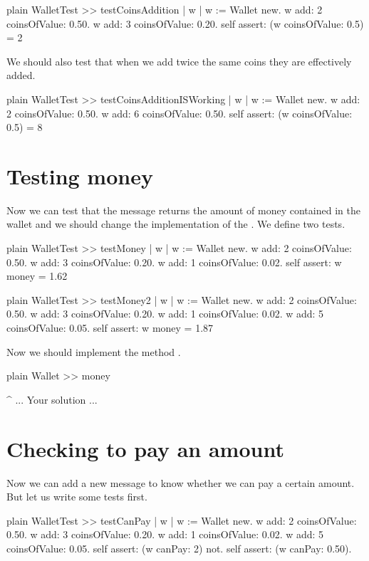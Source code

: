 \documentclass[10pt,twoside,english]{_support/latex/sbabook/sbabook}
\begin{document}
\begin{displaycode}{plain}
WalletTest >> testCoinsAddition
	| w |
	w := Wallet new.
	w add: 2 coinsOfValue: 0.50.
	w add: 3 coinsOfValue: 0.20.
	self assert: (w coinsOfValue: 0.5) = 2
\end{displaycode}

We should also test that when we add twice the same coins they are effectively added. 

\begin{displaycode}{plain}
WalletTest >> testCoinsAdditionISWorking
	| w |
	w := Wallet new.
	w add: 2 coinsOfValue: 0.50.
	w add: 6 coinsOfValue: 0.50.
	self assert: (w coinsOfValue: 0.5) = 8
\end{displaycode}
\section{Testing money}
Now we can test that the  message returns the amount of money contained in the wallet and we should change
the implementation of the . We define two tests. 

\begin{displaycode}{plain}
WalletTest >> testMoney
	| w |
	w := Wallet new.
	w add: 2 coinsOfValue: 0.50.
	w add: 3 coinsOfValue: 0.20.
	w add: 1 coinsOfValue: 0.02.
	self assert: w money = 1.62
\end{displaycode}

\begin{displaycode}{plain}
WalletTest >> testMoney2
	| w |
	w := Wallet new.
	w add: 2 coinsOfValue: 0.50.
	w add: 3 coinsOfValue: 0.20.
	w add: 1 coinsOfValue: 0.02.
	w add: 5 coinsOfValue: 0.05.
	self assert: w money = 1.87
\end{displaycode}

Now we should implement the method . 

\begin{displaycode}{plain}
Wallet >> money

	^ ... Your solution ...
\end{displaycode}
\section{Checking to pay an amount}
Now we can add a new message to know whether we can pay a certain amount. But let us write some tests first. 

\begin{displaycode}{plain}
WalletTest >> testCanPay
	| w |
	w := Wallet new.
	w add: 2 coinsOfValue: 0.50.
	w add: 3 coinsOfValue: 0.20.
	w add: 1 coinsOfValue: 0.02.
	w add: 5 coinsOfValue: 0.05.
	self assert: (w canPay: 2) not.
	self assert: (w canPay: 0.50).
\end{displaycode}
\end{document}
